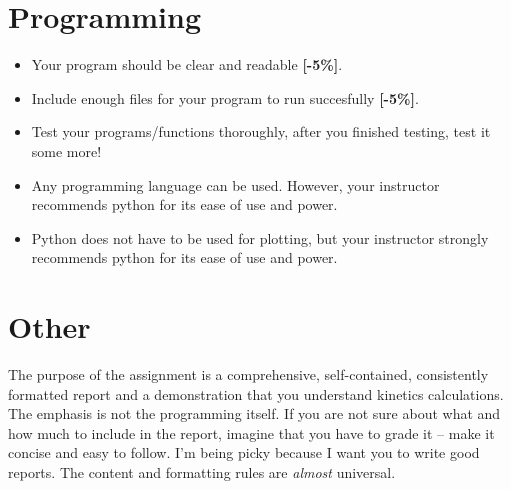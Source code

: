 \documentclass{article}
\begin{document}
        \section{Programming}

        \begin{itemize}
                \item Your program should be clear and readable {\color{red}\textbf{[-5\%]}}. 
                \item Include enough files for your program to run succesfully {\color{red}\textbf{[-5\%]}}. 
                \item Test your programs/functions thoroughly, after you finished testing, test 
it some more!
\item    Any programming language can be used. However, your instructor 
        recommends python for its ease of use and power.
\item   Python does not have to be used for plotting, but your instructor 
        strongly recommends python for its ease of use and power.
        \end{itemize}

        \section{Other}
  The purpose of the assignment is a comprehensive, self-contained, 
  consistently formatted report and a demonstration that you understand 
  kinetics calculations. The emphasis is not the programming itself.  If you 
  are not sure about what and how much to include in the report, imagine that 
  you have to grade it – make it concise and easy to follow. I’m being picky 
  because I want you to write good reports.  The content and formatting rules 
  are \emph{almost} universal.
\end{document}
